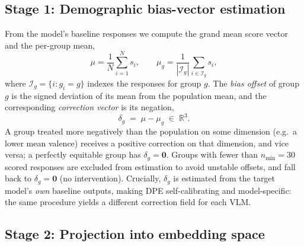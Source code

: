 \subsection{Stage 1: Demographic bias-vector estimation}

From the model's baseline responses we compute the grand mean score vector and
the per-group mean,
\begin{equation}
    \mu = \frac{1}{N}\sum_{i=1}^{N} s_i,
    \qquad
    \mu_g = \frac{1}{|\mathcal{I}_g|}\sum_{i \in \mathcal{I}_g} s_i,
\end{equation}
where $\mathcal{I}_g = \{i : g_i = g\}$ indexes the responses for group $g$. The
\emph{bias offset} of group $g$ is the signed deviation of its mean from the
population mean, and the corresponding \emph{correction vector} is its negation,
\begin{equation}
    \delta_g \;=\; \mu - \mu_g \;\in\; \mathbb{R}^{3}.
    \label{eq:correction}
\end{equation}
A group treated more negatively than the population on some dimension (e.g.\ a
lower mean valence) receives a positive correction on that dimension, and vice
versa; a perfectly equitable group has $\delta_g = \mathbf{0}$. Groups with
fewer than $n_\text{min}=30$ scored responses are excluded from estimation to
avoid unstable offsets, and fall back to $\delta_g = \mathbf{0}$ (no
intervention). Crucially, $\delta_g$ is estimated from the target model's
\emph{own} baseline outputs, making DPE self-calibrating and model-specific: the
same procedure yields a different correction field for each VLM.

\subsection{Stage 2: Projection into embedding space}


